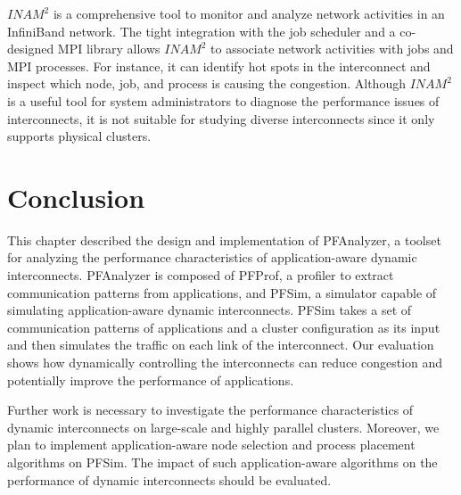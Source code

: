 \(\mathit{INAM}^2\) \autocite{Subramoni2016} is a comprehensive tool to
monitor and analyze network activities in an InfiniBand network. The
tight integration with the job scheduler and a co-designed MPI library
allows \(\mathit{INAM}^2\) to associate network activities with jobs and
MPI processes. For instance, it can identify hot spots in the
interconnect and inspect which node, job, and process is causing the
congestion. Although \(\mathit{INAM}^2\) is a useful tool for system
administrators to diagnose the performance issues of interconnects, it
is not suitable for studying diverse interconnects since it only
supports physical clusters.

\section{Conclusion}\label{sec:ii-conclusion}

This chapter described the design and implementation of PFAnalyzer, a
toolset for analyzing the performance characteristics of
application-aware dynamic interconnects. PFAnalyzer is composed of
PFProf, a profiler to extract communication patterns from applications,
and PFSim, a simulator capable of simulating application-aware dynamic
interconnects. PFSim takes a set of communication patterns of
applications and a cluster configuration as its input and then simulates
the traffic on each link of the interconnect. Our evaluation shows how
dynamically controlling the interconnects can reduce congestion and
potentially improve the performance of applications.

Further work is necessary to investigate the performance characteristics
of dynamic interconnects on large-scale and highly parallel clusters.
Moreover, we plan to implement application-aware node selection and
process placement algorithms on PFSim. The impact of such
application-aware algorithms on the performance of dynamic interconnects
should be evaluated.
